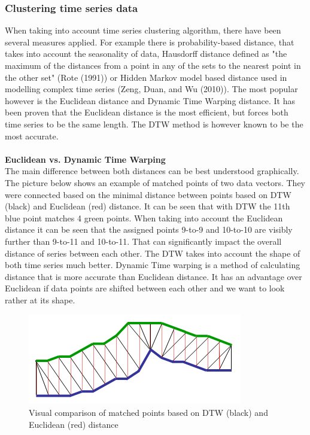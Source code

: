 \documentclass[11pt,a4paper]{article}
\begin{document}
\subsubsection{Clustering time series data}
When taking into account time series clustering algorithm, there have been
several measures applied. For example there is probability-based distance, that
takes into account the seasonality of data, Hausdorff distance defined as "the
maximum of the distances from a point in any of the sets to the nearest point in
the other set" (Rote (1991)) or Hidden Markov model based distance used in
modelling complex time series (Zeng, Duan, and Wu (2010)). The most popular
however is the Euclidean distance and Dynamic Time Warping distance. It has been
proven that the Euclidean distance is the most efficient, but forces both time
series to be the same length. The DTW method is however known to be the most
accurate.\\
\\
\textbf{Euclidean vs. Dynamic Time Warping}\\
The main difference between both distances can be best understood graphically.
The picture below shows an example of matched points of two data vectors. They
were connected based on the minimal distance between points based on DTW (black)
and Euclidean (red) distance. It can be seen that with DTW the 11th blue point
matches 4 green points. When taking into account the Euclidean distance it can
be seen that the assigned points 9-to-9 and 10-to-10 are visibly further than
9-to-11 and 10-to-11. That can significantly impact the overall distance of
series between each other. The DTW takes into account the shape of both time
series much better. Dynamic Time warping is a method of calculating distance
that is more accurate than Euclidean distance. It has an advantage over
Euclidean if data points are shifted between each other and we want to look
rather at its shape.
\begin{figure}[H]
    \begin{center}
        \hspace*{-0.3cm}
        \includegraphics[scale=1.1]{img/euclidean-dtw.png}
    \end{center}
    \caption{Visual comparison of matched points based on DTW (black) and Euclidean (red) distance}
\end{figure}
\end{document}
